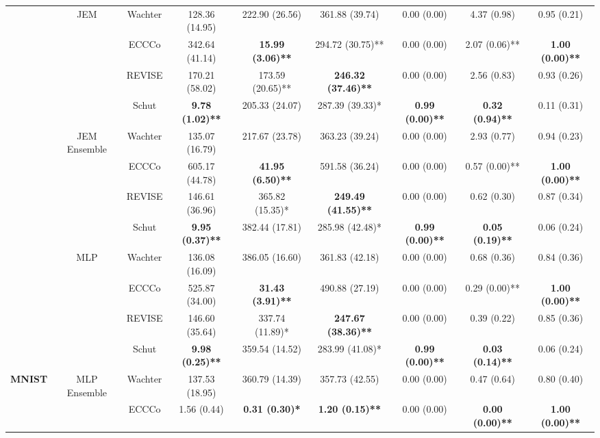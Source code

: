 \begin{table}
{\begin{tabular}[t]{>{}c|c|c|c|c|c|c|c|c}
 & \multirow{-4}{*}{\centering\arraybackslash JEM} & Wachter & 128.36 (14.95) & 222.90 (26.56) & 361.88 (39.74) & 0.00 (0.00) & 4.37 (0.98) & 0.95 (0.21)\\
\cline{2-9}
 &  & ECCCo & 342.64 (41.14) & \textbf{15.99 (3.06)**} & 294.72 (30.75)** & 0.00 (0.00) & 2.07 (0.06)** & \textbf{1.00 (0.00)**}\\

 &  & REVISE & 170.21 (58.02) & 173.59 (20.65)** & \textbf{246.32 (37.46)**} & 0.00 (0.00) & 2.56 (0.83) & 0.93 (0.26)\\

 &  & Schut & \textbf{9.78 (1.02)**} & 205.33 (24.07) & 287.39 (39.33)* & \textbf{0.99 (0.00)**} & \textbf{0.32 (0.94)**} & 0.11 (0.31)\\

 & \multirow{-4}{*}{\centering\arraybackslash JEM Ensemble} & Wachter & 135.07 (16.79) & 217.67 (23.78) & 363.23 (39.24) & 0.00 (0.00) & 2.93 (0.77) & 0.94 (0.23)\\
\cline{2-9}
 &  & ECCCo & 605.17 (44.78) & \textbf{41.95 (6.50)**} & 591.58 (36.24) & 0.00 (0.00) & 0.57 (0.00)** & \textbf{1.00 (0.00)**}\\

 &  & REVISE & 146.61 (36.96) & 365.82 (15.35)* & \textbf{249.49 (41.55)**} & 0.00 (0.00) & 0.62 (0.30) & 0.87 (0.34)\\

 &  & Schut & \textbf{9.95 (0.37)**} & 382.44 (17.81) & 285.98 (42.48)* & \textbf{0.99 (0.00)**} & \textbf{0.05 (0.19)**} & 0.06 (0.24)\\

 & \multirow{-4}{*}{\centering\arraybackslash MLP} & Wachter & 136.08 (16.09) & 386.05 (16.60) & 361.83 (42.18) & 0.00 (0.00) & 0.68 (0.36) & 0.84 (0.36)\\
\cline{2-9}
 &  & ECCCo & 525.87 (34.00) & \textbf{31.43 (3.91)**} & 490.88 (27.19) & 0.00 (0.00) & 0.29 (0.00)** & \textbf{1.00 (0.00)**}\\

 &  & REVISE & 146.60 (35.64) & 337.74 (11.89)* & \textbf{247.67 (38.36)**} & 0.00 (0.00) & 0.39 (0.22) & 0.85 (0.36)\\

 &  & Schut & \textbf{9.98 (0.25)**} & 359.54 (14.52) & 283.99 (41.08)* & \textbf{0.99 (0.00)**} & \textbf{0.03 (0.14)**} & 0.06 (0.24)\\

\multirow{-16}{*}{\centering\arraybackslash \textbf{MNIST}} & \multirow{-4}{*}{\centering\arraybackslash MLP Ensemble} & Wachter & 137.53 (18.95) & 360.79 (14.39) & 357.73 (42.55) & 0.00 (0.00) & 0.47 (0.64) & 0.80 (0.40)\\
\cline{1-9}
 &  & ECCCo & 1.56 (0.44) & \textbf{0.31 (0.30)*} & \textbf{1.20 (0.15)**} & 0.00 (0.00) & \textbf{0.00 (0.00)**} & \textbf{1.00 (0.00)**}\\


\end{tabular}}
\end{table}
